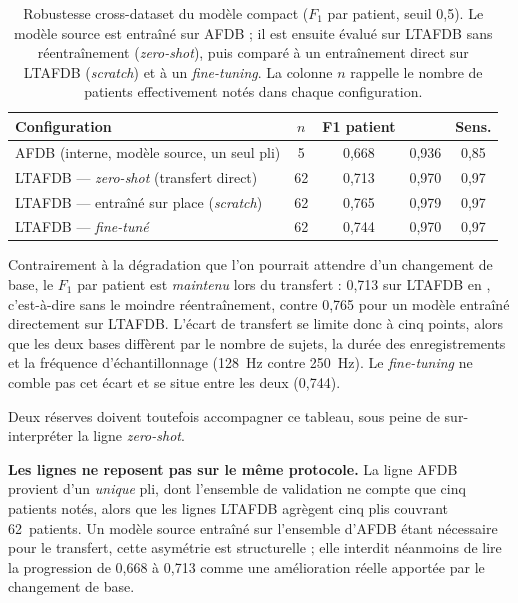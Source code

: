 \begin{table}[H]
  \centering
  \caption{Robustesse cross-dataset du modèle compact (\(F_1\) par patient, seuil 0,5). Le modèle source est entraîné sur AFDB ; il est ensuite évalué sur LTAFDB sans réentraînement (\textit{zero-shot}), puis comparé à un entraînement direct sur LTAFDB (\textit{scratch}) et à un \textit{fine-tuning}. La colonne \(n\) rappelle le nombre de patients effectivement notés dans chaque configuration.}
  \label{tab:res:cross}
  \begin{tabular}{lcccc}
    \toprule
    \textbf{Configuration} & \(n\) & \textbf{F1 patient} & \textbf{\AUROC{}} & \textbf{Sens.} \\
    \midrule
    AFDB (interne, modèle source, un seul pli) & 5  & 0,668 & 0,936 & 0,85 \\
    LTAFDB — \textit{zero-shot} (transfert direct) & 62 & 0,713 & 0,970 & 0,97 \\
    LTAFDB — entraîné sur place (\textit{scratch}) & 62 & 0,765 & 0,979 & 0,97 \\
    LTAFDB — \textit{fine-tuné}                    & 62 & 0,744 & 0,970 & 0,97 \\
    \bottomrule
  \end{tabular}
\end{table}

Contrairement à la dégradation que l'on pourrait attendre d'un changement de base, le \(F_1\) par patient est \emph{maintenu} lors du transfert : 0,713 sur LTAFDB en , c'est-à-dire sans le moindre réentraînement, contre 0,765 pour un modèle entraîné directement sur LTAFDB. L'écart de transfert se limite donc à cinq points, alors que les deux bases diffèrent par le nombre de sujets, la durée des enregistrements et la fréquence d'échantillonnage (128~Hz contre 250~Hz). Le \textit{fine-tuning} ne comble pas cet écart et se situe entre les deux (0,744).

Deux réserves doivent toutefois accompagner ce tableau, sous peine de sur-interpréter la ligne \textit{zero-shot}.

\textbf{Les lignes ne reposent pas sur le même protocole.} La ligne AFDB provient d'un \emph{unique} pli, dont l'ensemble de validation ne compte que cinq patients notés, alors que les lignes LTAFDB agrègent cinq plis couvrant 62~patients. Un modèle source entraîné sur l'ensemble d'AFDB étant nécessaire pour le transfert, cette asymétrie est structurelle ; elle interdit néanmoins de lire la progression de 0,668 à 0,713 comme une amélioration réelle apportée par le changement de base.


